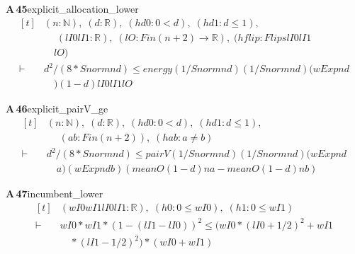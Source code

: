 \documentclass[conference]{IEEEtran}
\theoremstyle{definition}
\newcommand{\lean}[1]{\textsf{\footnotesize #1}}
\begin{document}
\noindent\textbf{A\,45}\quad\lean{explicit\_allocation\_lower}
{\footnotesize\[ \begin{aligned}[t]
&(\mathit{n} : \mathbb{N} ),\; (\mathit{d} : \mathbb{R} ),\; (\mathit{hd0} : 0 < \mathit{d}),\; (\mathit{hd1} : \mathit{d} \leq 1),\\
&\quad \; (\mathit{lI0} \mathit{lI1} : \mathbb{R} ),\; (\mathit{lO} : \mathit{Fin} (\mathit{n}+2) \to \mathbb{R} ),\; (\mathit{hflip} : \mathit{Flips} \mathit{lI0} \mathit{lI1}\\
&\quad \mathit{lO})\\
\vdash\;&\mathit{d}^{2}/(8*\mathit{Snorm} \mathit{n} \mathit{d}) \leq \mathit{energy} (1/\mathit{Snorm} \mathit{n} \mathit{d}) (1/\mathit{Snorm} \mathit{n} \mathit{d}) (\mathit{wExp} \mathit{n} \mathit{d}\\
&\quad ) (1-\mathit{d}) \mathit{lI0} \mathit{lI1} \mathit{lO}
\end{aligned} \]}

\noindent\textbf{A\,46}\quad\lean{explicit\_pairV\_ge}
{\footnotesize\[ \begin{aligned}[t]
&(\mathit{n} : \mathbb{N} ),\; (\mathit{d} : \mathbb{R} ),\; (\mathit{hd0} : 0 < \mathit{d}),\; (\mathit{hd1} : \mathit{d} \leq 1),\\
&\quad \; (\mathit{a} \mathit{b} : \mathit{Fin} (\mathit{n}+2)),\; (\mathit{hab} : \mathit{a} \neq \mathit{b})\\
\vdash\;&\mathit{d}^{2}/(8*\mathit{Snorm} \mathit{n} \mathit{d}) \leq \mathit{pairV} (1/\mathit{Snorm} \mathit{n} \mathit{d}) (1/\mathit{Snorm} \mathit{n} \mathit{d}) (\mathit{wExp} \mathit{n} \mathit{d}\\
&\quad \mathit{a}) (\mathit{wExp} \mathit{n} \mathit{d} \mathit{b}) (\mathit{meanO} (1-\mathit{d}) \mathit{n} \mathit{a} - \mathit{meanO} (1-\mathit{d}) \mathit{n} \mathit{b})
\end{aligned} \]}

\noindent\textbf{A\,47}\quad\lean{incumbent\_lower}
{\footnotesize\[ \begin{aligned}[t]
&(\mathit{wI0} \mathit{wI1} \mathit{lI0} \mathit{lI1} : \mathbb{R} ),\; (\mathit{h0} : 0 \leq \mathit{wI0}),\; (\mathit{h1} : 0 \leq \mathit{wI1})\\
\vdash\;&\mathit{wI0}*\mathit{wI1}*(1-(\mathit{lI1}-\mathit{lI0}))^{2} \leq (\mathit{wI0}*(\mathit{lI0}+1/2)^{2} + \mathit{wI1}\\
&\quad *(\mathit{lI1}-1/2)^{2})*(\mathit{wI0}+\mathit{wI1})
\end{aligned} \]}
\end{document}

